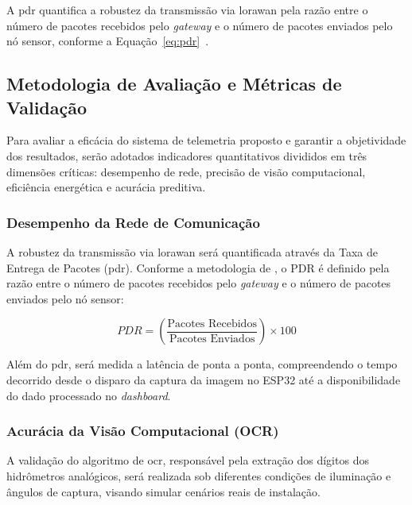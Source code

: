 A \gls{pdr} quantifica a robustez da 
transmissão via \gls{lorawan} pela razão entre o número de pacotes recebidos 
pelo \textit{gateway} e o número de pacotes enviados pelo nó sensor, 
conforme a Equação~\ref{eq:pdr}~\cite{bravo2025ants}.


\subsection{Metodologia de Avaliação e Métricas de Validação}
\label{sec:metricas}

Para avaliar a eficácia do sistema de telemetria proposto e garantir a objetividade dos resultados, serão adotados indicadores quantitativos divididos em três dimensões críticas: desempenho de rede, precisão de visão computacional, eficiência energética e acurácia preditiva.

\subsubsection{Desempenho da Rede de Comunicação}
A robustez da transmissão via \gls{lorawan} será quantificada através da Taxa de Entrega de Pacotes (\gls{pdr}). 
Conforme a metodologia de , o PDR é definido pela razão entre o número de pacotes recebidos pelo \textit{gateway} e o número de pacotes enviados pelo nó sensor:

\begin{equation}
\label{eq:pdr}
PDR = \left( \frac{\text{Pacotes Recebidos}}{\text{Pacotes Enviados}} \right) \times 100
\end{equation}

Além do \gls{pdr}, será medida a latência de ponta a ponta, compreendendo o tempo decorrido desde o disparo da captura da imagem no ESP32 até a disponibilidade do dado processado no \textit{dashboard}.


\subsubsection{Acurácia da Visão Computacional (OCR)}
A validação do algoritmo de \gls{ocr}, responsável pela extração dos dígitos dos hidrômetros analógicos, será realizada sob diferentes condições de iluminação e ângulos de captura, visando simular cenários reais de instalação. 

